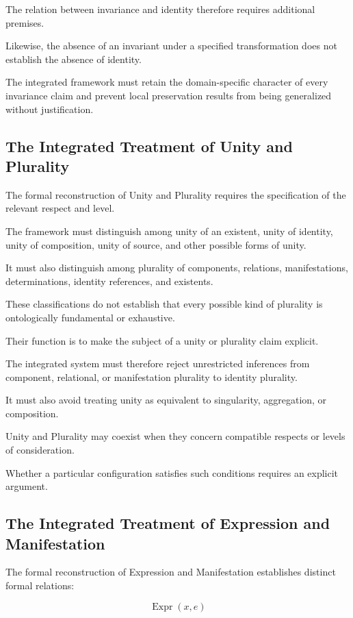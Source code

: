 The relation between invariance
and identity therefore requires
additional premises.

Likewise, the absence of an
invariant under a specified
transformation does not establish
the absence of identity.

The integrated framework must
retain the domain-specific
character of every invariance
claim and prevent local
preservation results from
being generalized without
justification.

\subsection{The Integrated Treatment of Unity and Plurality}

The formal reconstruction of
Unity and Plurality requires
the specification of the
relevant respect and level.

The framework must distinguish
among unity of an existent,
unity of identity, unity
of composition, unity of
source, and other possible
forms of unity.

It must also distinguish
among plurality of components,
relations, manifestations,
determinations, identity
references, and existents.

These classifications do not
establish that every possible
kind of plurality is ontologically
fundamental or exhaustive.

Their function is to make
the subject of a unity
or plurality claim explicit.

The integrated system must
therefore reject unrestricted
inferences from component,
relational, or manifestation
plurality to identity plurality.

It must also avoid treating
unity as equivalent to
singularity, aggregation,
or composition.

Unity and Plurality may
coexist when they concern
compatible respects or
levels of consideration.

Whether a particular
configuration satisfies
such conditions requires
an explicit argument.

\subsection{The Integrated Treatment of Expression and Manifestation}

The formal reconstruction
of Expression and Manifestation
establishes distinct formal
relations:

\[
    \operatorname{Expr}(x,e)
\]

